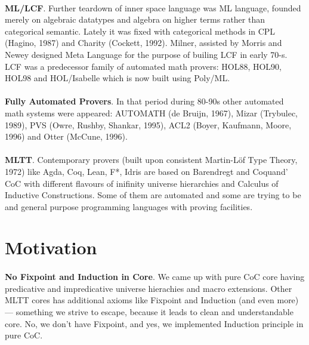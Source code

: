 \documentclass[11pt,oneside]{article}
\begin{document}
\paragraph{}
{\bf ML/LCF}. Further teardown of inner space language was ML language, founded merely on algebraic
datatypes and algebra on higher terms rather than categorical semantic. Lately it
was fixed with categorical methods in CPL (Hagino, 1987) and Charity (Cockett, 1992).
Milner, assisted by Morris and Newey designed Meta Language for the purpose of builing LCF
in early 70-s. LCF was a predecessor family of automated math provers: HOL88,
HOL90, HOL98 and HOL/Isabelle which is now built using Poly/ML.

\paragraph{}
{\bf Fully Automated Provers}. In that period during 80-90s other automated math systems were appeared:
AUTOMATH (de Bruijn, 1967), Mizar (Trybulec, 1989), PVS (Owre, Rushby, Shankar, 1995),
ACL2 (Boyer, Kaufmann, Moore, 1996) and Otter (McCune, 1996).

\paragraph{}
{\bf MLTT}. Contemporary provers (built upon consistent Martin-Löf Type Theory, 1972)
like Agda, Coq, Lean, F*, Idris are based on Barendregt
and Coquand' CoC with different flavours of inifinity universe hierarchies
and Calculus of Inductive Constructions. Some of them are automated and some
are trying to be and general purpose programming languages with proving facilities.

\newpage
\section{Motivation}

\paragraph{}
{\bf No Fixpoint and Induction in Core}. We came up with pure CoC core having
predicative and impredicative universe hierachies and macro extensions. Other MLTT
cores has additional axioms like Fixpoint and Induction (and even more) ---
something we strive to escape, because it leads to clean and understandable core.
No, we don't have Fixpoint, and yes, we implemented Induction principle in pure CoC.
\end{document}
